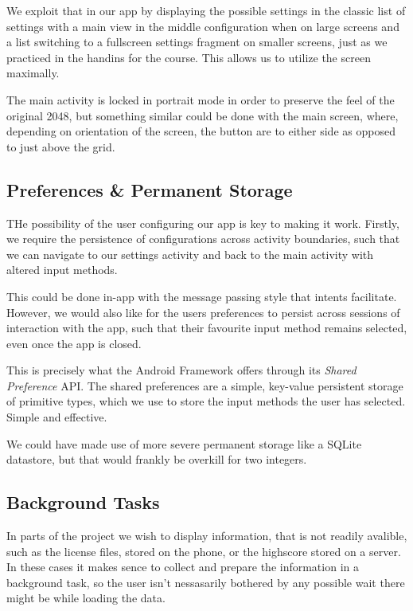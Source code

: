 \documentclass[a4paper, 12pt]{article}
\begin{document}
We exploit that in our app by displaying the possible settings in the
classic list of settings with a main view in the middle configuration
when on large screens and a list switching to a fullscreen settings
fragment on smaller screens, just as we practiced in the handins for
the course. This allows us to utilize the screen maximally.

The main activity is locked in portrait mode in order to preserve the
feel of the original 2048, but something similar could be done with
the main screen, where, depending on orientation of the screen, the
button are to either side as opposed to just above the grid.

\subsection{Preferences \& Permanent Storage}
THe possibility of the user configuring our app is key to making it
work. Firstly, we require the persistence of configurations across
activity boundaries, such that we can navigate to our settings
activity and back to the main activity with altered input methods.

This could be done in-app with the message passing style that intents
facilitate. However, we would also like for the users preferences to
persist across sessions of interaction with the app, such that their
favourite input method remains selected, even once the app is closed.

This is precisely what the Android Framework offers through its
\emph{Shared Preference} API. The shared preferences are a simple,
key-value persistent storage of primitive types, which we use to store
the input methods the user has selected. Simple and effective.

We could have made use of more severe permanent storage like a SQLite
datastore, but that would frankly be overkill for two integers.

\subsection{Background Tasks}
In parts of the project we wish to display information, that is not
readily avalible, such as the license files, stored on the phone, or
the highscore stored on a server. In these cases it makes sence to
collect and prepare the information in a background task, so the user
isn't nessasarily bothered by any possible wait there might be while
loading the data.
\end{document}
